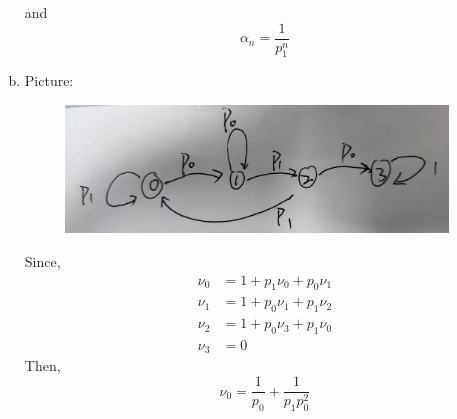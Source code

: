 \documentclass{article}
\begin{document}
\begin{enumerate}[(a)]
        and
        \begin{equation*}
            \alpha_n = \frac{1}{p_1^n}            
        \end{equation*}

        \item
        Picture:
        \begin{figure}[h]
            \centering
            \includegraphics[width=4.0in]{4.jpg}
        \end{figure}
        Since,
        \begin{equation*}
            \begin{aligned}
                \nu_0 &= 1+ p_1\nu_0+p_0\nu_1\\
                \nu_1 &= 1+ p_0\nu_1+p_1\nu_2\\
                \nu_2 &= 1+ p_0\nu_3+p_1\nu_0\\
                \nu_3 &= 0
            \end{aligned}
        \end{equation*}
        Then,
        \begin{equation*}
            \nu_0=\frac{1}{p_0}+\frac{1}{p_1p_0^2}
        \end{equation*}        
    \end{enumerate}
\end{document}

